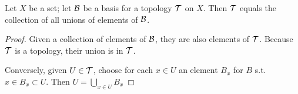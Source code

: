 \documentclass[11pt]{article}
\begin{document}
\begin{lemma}[]
Let \(X\) be a set; let \(\mathcal{B}\) be a basis for a topology \(\mathcal{T}\) on \(X\). Then \(\mathcal{T}\) equals the
collection of all unions of elements of \(\mathcal{B}\).
\end{lemma}

\begin{proof}
Given a collection of elements of \(\mathcal{B}\), they are also elements of \(\mathcal{T}\). Because \(\mathcal{T}\) is a
topology, their union is in \(\mathcal{T}\).

Conversely, given \(U\in\mathcal{T}\), choose for each \(x\in U\) an element \(B_x\) for \(B\)
s.t. \(x\in B_x\subset U\). Then \(U=\bigcup_{x\in U}B_x\)
\end{proof}
\end{document}
